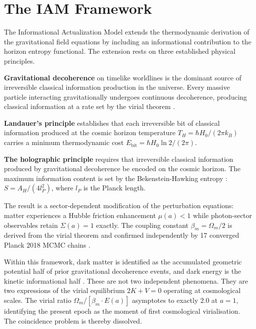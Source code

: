 \documentclass[12pt,a4paper]{article}
\begin{document}
\section{The IAM Framework}
\label{sec:framework}

The Informational Actualization Model \citep{mahaffey2026} extends the
thermodynamic derivation of the gravitational field equations
\citep{jacobson1995} by including an informational contribution to the
horizon entropy functional. The extension rests on three established
physical principles.

\textbf{Gravitational decoherence} on timelike worldlines is the
dominant source of irreversible classical information production in the
universe. Every massive particle interacting gravitationally undergoes
continuous decoherence, producing classical information at a rate set
by the virial theorem \citep{mahaffey2026_virial}.

\textbf{Landauer's principle} \citep{landauer1961} establishes that
each irreversible bit of classical information produced at the cosmic
horizon temperature $T_H = \hbar H_0 / (2\pi k_B)$ \citep{gibbons1977}
carries a minimum thermodynamic cost $E_\mathrm{bit} = \hbar H_0 \ln 2
/ (2\pi)$.

\textbf{The holographic principle} \citep{thooft1993,susskind1995}
requires that irreversible classical information produced by
gravitational decoherence be encoded on the cosmic horizon. The maximum
information content is set by the Bekenstein-Hawking entropy
\citep{bekenstein1973,hawking1975}: $S = A_H / (4 l_P^2)$, where $l_P$
is the Planck length.

The result is a sector-dependent modification of the perturbation
equations: matter experiences a Hubble friction enhancement
$\mu(a) < 1$ while photon-sector observables retain $\Sigma(a) = 1$
exactly. The coupling constant $\beta_m = \Omega_m / 2$ is derived from
the virial theorem and confirmed independently by 17 converged Planck
2018 MCMC chains \citep{mahaffey2026}.

Within this framework, dark matter is identified as the accumulated
geometric potential half of prior gravitational decoherence events, and
dark energy is the kinetic informational half \citep{mahaffey2026_virial_dm}.
These are not two independent phenomena. They are two expressions of the
virial equilibrium $2K + V = 0$ operating at cosmological scales. The
virial ratio $\Omega_m / [\beta_m \cdot E(a)]$ asymptotes to exactly
$2.0$ at $a = 1$, identifying the present epoch as the moment of first
cosmological virialisation. The coincidence problem is thereby dissolved.
\end{document}
